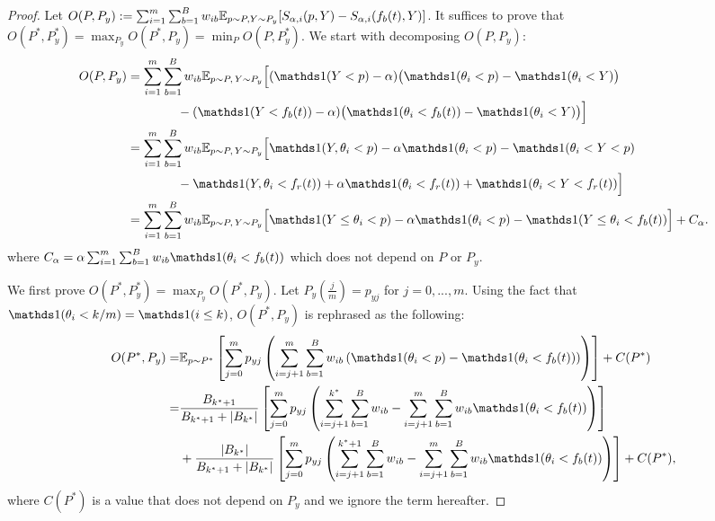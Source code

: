 \begin{proof}
  Let $O(P,P_y) := \sum_{i=1}^{m} \sum_{b=1}^B w_{ib}\mathbb{E}_{p\sim P, Y \sim P_y}[S_{\alpha,i}(p,Y) - S_{\alpha,i}(f_b(t),Y)]$.
  It suffices to prove that $O(P^*, P_y^*) = \max_{P_y} O(P^*, P_y) = \min_P O(P, P_y^*)$. We start with decomposing $O(P, P_y)$:
  \begin{align}
    \label{eq:oppy_q}
    O(P, P_y)
    &= \sum_{i=1}^{m} \sum_{b=1}^B w_{ib}
    \mathbb{E}_{p\sim P,\, Y \sim P_y} \Big[
    (\one(Y<p)-\alpha)\big(\one(\theta_i<p)-\one(\theta_i<Y)\big) \nonumber \\
    &\qquad\qquad
    - (\one(Y<f_b(t))-\alpha)\big(\one(\theta_i<f_b(t))-\one(\theta_i<Y)\big)
    \Big] \nonumber \\
    &= \sum_{i=1}^{m} \sum_{b=1}^B w_{ib}
    \mathbb{E}_{p\sim P,\, Y \sim P_y} \Big[
    \one(Y, \theta_i < p)
    - \alpha \one(\theta_i<p)
    - \one(\theta_i<Y<p) \nonumber \\
    &\qquad\qquad
    - \one(Y, \theta_i < f_r(t))
    + \alpha \one(\theta_i<f_r(t))
    + \one(\theta_i<Y<f_r(t))
    \Big] \nonumber \\
    &= \sum_{i=1}^{m} \sum_{b=1}^B w_{ib}
    \mathbb{E}_{p\sim P,\, Y \sim P_y} \Big[
    \one(Y \le \theta_i < p)
    - \alpha \one(\theta_i<p)
    - \one(Y \le \theta_i < f_b(t))
    \Big] + C_\alpha.
    \end{align}
  where $C_\alpha=\alpha \sum_{i=1}^{m} \sum_{b=1}^B w_{ib} \one(\theta_i < f_b(t))$ which does not depend on $P$ or $P_y$.
  
  \smallskip
  We first prove $O(P^*, P_y^*) = \max_{P_y} O(P^*, P_y)$. Let $P_y(\frac{j}{m})=p_{yj}$ for $j=0,...,m$. 
  Using the fact that $\one(\theta_i < k/m) = \one(i \leq k)$, $O(P^*, P_y)$ is rephrased as the following:
  \begin{align}
  O(P^*, P_y) 
  =& \E_{p\sim P^*} \left[\sum_{j=0}^m p_{yj} 
  \left(\sum_{i=j+1}^{m} \sum_{b=1}^B w_{ib} \left(\one(\theta_i < p) - \one(\theta_i < f_b(t))\right) \right) \right] + C(P^*) \nonumber\\
  =& \frac{B_{k^*+1}}{B_{k^*+1} + |B_{k^*}|} \left[\sum_{j=0}^m p_{yj} 
  \left(\sum_{i=j+1}^{k^*} \sum_{b=1}^B w_{ib} - \sum_{i=j+1}^{m} \sum_{b=1}^B w_{ib} \one(\theta_i < f_b(t)) \right) \right] \nonumber\\
  &+ \frac{|B_{k^*}|}{B_{k^*+1} + |B_{k^*}|} \left[\sum_{j=0}^m p_{yj} 
  \left(\sum_{i=j+1}^{k^*+1} \sum_{b=1}^B w_{ib} - \sum_{i=j+1}^{m} \sum_{b=1}^B w_{ib} \one(\theta_i < f_b(t)) \right) \right] + C(P^*) \label{eq:opstarpy_q},
  \end{align}
  where $C(P^*)$ is a value that does not depend on $P_y$ and we ignore the term hereafter. %
  

\end{proof}
